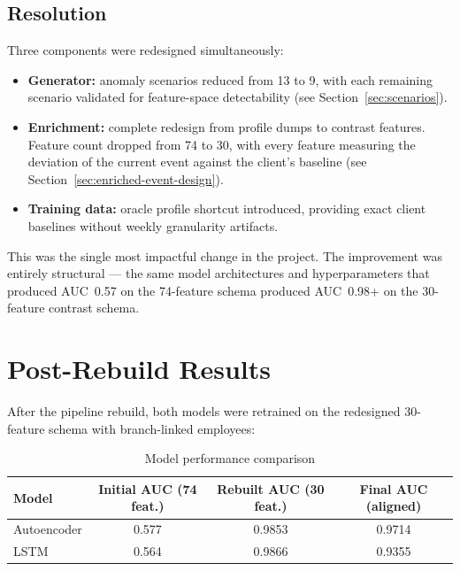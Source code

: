\subsection{Resolution}

Three components were redesigned simultaneously:

\begin{itemize}[leftmargin=2cm]
    \item \textbf{Generator:} anomaly scenarios reduced from 13 to 9, with
          each remaining scenario validated for feature-space detectability
          (see Section~\ref{sec:scenarios}).
    \item \textbf{Enrichment:} complete redesign from profile dumps to
          contrast features. Feature count dropped from 74 to 30, with
          every feature measuring the deviation of the current event against
          the client's baseline (see Section~\ref{sec:enriched-event-design}).
    \item \textbf{Training data:} oracle profile shortcut introduced,
          providing exact client baselines without weekly granularity
          artifacts.
\end{itemize}

This was the single most impactful change in the project. The improvement
was entirely structural --- the same model architectures and hyperparameters
that produced AUC~0.57 on the 74-feature schema produced AUC~0.98+ on the
30-feature contrast schema.

\section{Post-Rebuild Results}

After the pipeline rebuild, both models were retrained on the redesigned
30-feature schema with branch-linked employees:

\begin{table}[H]
\centering
\caption{Model performance comparison}
\label{tab:model-performance}
\begin{tabular}{@{}lccc@{}}
\toprule
\textbf{Model} & \textbf{Initial AUC (74 feat.)} &
\textbf{Rebuilt AUC (30 feat.)} & \textbf{Final AUC (aligned)} \\
\midrule
Autoencoder & 0.577 & 0.9853 & 0.9714 \\
LSTM        & 0.564 & 0.9866 & 0.9355 \\
\bottomrule
\end{tabular}
\end{table}

